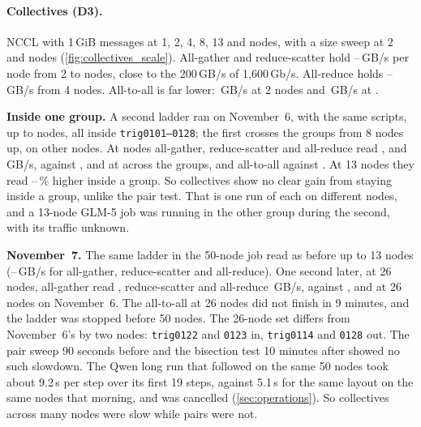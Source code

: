 \paragraph{Collectives (D3).} NCCL with 1\,GiB messages at 1, 2, 4, 8, 13 and \TriNetTop{} nodes, with a size sweep at 2 and \TriNetTop{} nodes (\cref{fig:collectives_scale}). All-gather and reduce-scatter hold \TriGatherLo--\TriGatherHi\,GB/s per node from 2 to \TriNetTop{} nodes, close to the 200\,GB/s of 1,600\,Gb/s. All-reduce holds \TriAllReduceLo--\TriAllReduceHi\,GB/s from 4 nodes. All-to-all is far lower: \TriAlltoallTwo\,GB/s at 2 nodes and \TriAlltoallFull\,GB/s at \TriNetTop.

\textbf{Inside one group.} A second ladder ran on November~6, with the same scripts, up to \TriNetInsideTop{} nodes, all inside \texttt{trig0101--0128}; the first crosses the groups from 8 nodes up, on other nodes. At \TriNetInsideTop{} nodes all-gather, reduce-scatter and all-reduce read \TriInGather, \TriInScatter{} and \TriInReduce\,GB/s, against \TriCrossGather, \TriCrossScatter{} and \TriCrossReduce{} at \TriNetTop{} across the groups, and all-to-all \TriInAlltoall{} against \TriAlltoallFull. At 13 nodes they read \TriInThirteenLo--\TriInThirteenHi\,\% higher inside a group. So collectives show no clear gain from staying inside a group, unlike the pair test. That is one run of each on different nodes, and a 13-node GLM-5 job was running in the other group during the second, with its traffic unknown.

\textbf{November~7.} The same ladder in the 50-node job read as before up to 13 nodes (\TriSevenThirteenLo--\TriSevenThirteenHi\,GB/s for all-gather, reduce-scatter and all-reduce). One second later, at 26 nodes, all-gather read \TriSevenGather, reduce-scatter \TriSevenScatter{} and all-reduce \TriSevenReduce\,GB/s, against \TriInGather, \TriInScatter{} and \TriInReduce{} at 26 nodes on November~6. The all-to-all at 26 nodes did not finish in 9 minutes, and the ladder was stopped before 50 nodes. The 26-node set differs from November~6's by two nodes: \texttt{trig0122} and \texttt{0123} in, \texttt{trig0114} and \texttt{0128} out. The pair sweep 90 seconds before and the bisection test 10 minutes after showed no such slowdown. The Qwen long run that followed on the same 50 nodes took about 9.2\,s per step over its first 19 steps, against 5.1\,s for the same layout on the same nodes that morning, and was cancelled (\cref{sec:operations}). So collectives across many nodes were slow while pairs were not.

